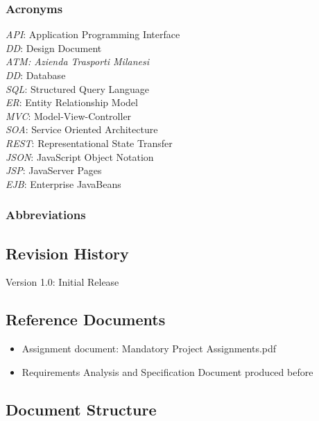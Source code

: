 \documentclass[12pt]{article}
\begin{document}
\subsubsection{Acronyms}
\textit{API}: Application Programming Interface\\
\textit{DD}: Design Document\\
\textit{ATM: Azienda Trasporti Milanesi}\\
\textit{DD}: Database\\
\textit{SQL}: Structured Query Language\\
\textit{ER}: Entity Relationship Model\\
\textit{MVC}: Model-View-Controller\\
\textit{SOA}: Service Oriented Architecture\\
\textit{REST}: Representational State Transfer\\
\textit{JSON}: JavaScript Object Notation\\
\textit{JSP}: JavaServer Pages\\
\textit{EJB}: Enterprise JavaBeans
\subsubsection{Abbreviations}


\subsection{Revision History}
Version 1.0: Initial Release

\subsection{Reference Documents}
\begin{itemize}
    \item Assignment document: Mandatory Project Assignments.pdf
    \item Requirements Analysis and Specification Document produced before
\end{itemize}


\subsection{Document Structure}
\end{document}
